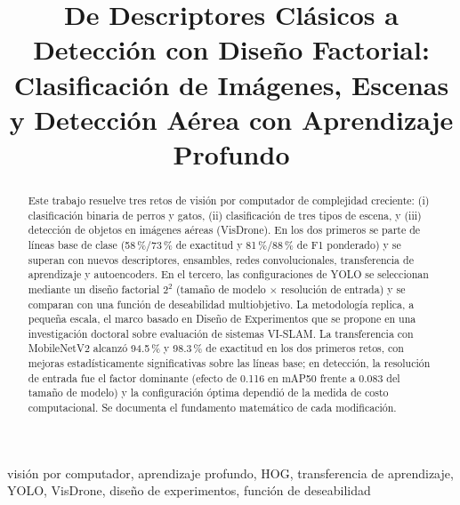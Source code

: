\documentclass[conference]{IEEEtran}
\begin{document}
\title{De Descriptores Clásicos a Detección con Diseño Factorial: Clasificación de Imágenes, Escenas y Detección Aérea con Aprendizaje Profundo}

\author{
}

\maketitle

\begin{abstract}
Este trabajo resuelve tres retos de visión por computador de complejidad creciente: (i) clasificación binaria de perros y gatos, (ii) clasificación de tres tipos de escena, y (iii) detección de objetos en imágenes aéreas (VisDrone). En los dos primeros se parte de líneas base de clase (58\,\%/73\,\% de exactitud y 81\,\%/88\,\% de F1 ponderado) y se superan con nuevos descriptores, ensambles, redes convolucionales, transferencia de aprendizaje y autoencoders. En el tercero, las configuraciones de YOLO se seleccionan mediante un diseño factorial $2^2$ (tamaño de modelo $\times$ resolución de entrada) y se comparan con una función de deseabilidad multiobjetivo. La metodología replica, a pequeña escala, el marco basado en Diseño de Experimentos que se propone en una investigación doctoral sobre evaluación de sistemas VI-SLAM. La transferencia con MobileNetV2 alcanzó 94.5\,\% y 98.3\,\% de exactitud en los dos primeros retos, con mejoras estadísticamente significativas sobre las líneas base; en detección, la resolución de entrada fue el factor dominante (efecto de 0.116 en mAP50 frente a 0.083 del tamaño de modelo) y la configuración óptima dependió de la medida de costo computacional. Se documenta el fundamento matemático de cada modificación.
\end{abstract}

\begin{IEEEkeywords}
visión por computador, aprendizaje profundo, HOG, transferencia de aprendizaje, YOLO, VisDrone, diseño de experimentos, función de deseabilidad
\end{IEEEkeywords}

\end{document}
